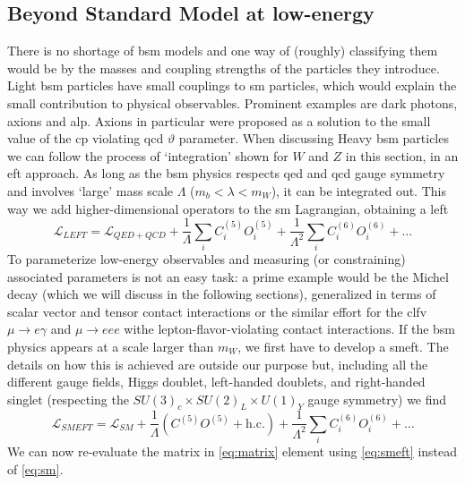 \begin{refsection}
    \subsection{Beyond Standard Model at low-energy}
        There is no shortage of \gls{bsm} models and one way of (roughly) classifying them would be by the masses and coupling strengths of the particles they introduce. 
        Light \gls{bsm} particles have small couplings to \gls{sm} particles, which would explain the small contribution to physical observables. Prominent examples are dark photons, axions and \gls{alp}.
        Axions in particular were proposed as a solution to the small value of the \gls{cp} violating \gls{qcd} $\vartheta$ parameter.
        When discussing Heavy \gls{bsm} particles we can follow the process of `integration' shown for $W$ and $Z$ in this section, in an \gls{eft} approach.
        As long as the \gls{bsm} physics respects \gls{qed} and \gls{qcd} gauge symmetry and involves `large' mass scale $\Lambda$ ($m_b<\lambda<m_W$), it can be integrated out. 
        This way we add higher-dimensional operators to the \gls{sm} Lagrangian, obtaining a \gls{left}
        \begin{equation}
            \mathcal{L}_{LEFT}= \mathcal{L}_{QED+QCD}+\frac{1}{\Lambda}\sum_iC^{(5)}_iO^{(5)}_i +\frac{1}{\Lambda^2}\sum_iC^{(6)}_iO^{(6)}_i +\dots
                \label{eq:left}
        \end{equation}
        To parameterize low-energy observables and measuring (or constraining) associated parameters is not an easy task: a prime example would be the Michel decay (which we will discuss in the following sections), generalized in terms of scalar vector and tensor contact interactions or the similar effort for the \gls{clfv} $\mu\rightarrow e \gamma$ and $\mu \rightarrow eee$ withe lepton-flavor-violating contact interactions.
        If the \gls{bsm} physics appears at a scale larger than $m_W$, we first have to develop a \gls{smeft}.
        The details on how this is achieved are outside our purpose but, including all the different gauge fields, Higgs doublet, left-handed doublets, and right-handed singlet (respecting the $SU(3)_c\times SU(2)_L\times U(1)_Y$ gauge symmetry) we find
        \begin{equation}
            \mathcal{L}_{SMEFT}=\mathcal{L}_{SM}+\frac{1}{\Lambda}(C^{(5)}O^{(5)}+\text{h.c.}) +\frac{1}{\Lambda^2}\sum_iC^{(6)}_iO^{(6)}_i +\dots
            \label{eq:smeft}
        \end{equation}
        We can now re-evaluate the matrix in \ref{eq:matrix} element using \ref{eq:smeft} instead of \ref{eq:sm}.

\end{refsection}
